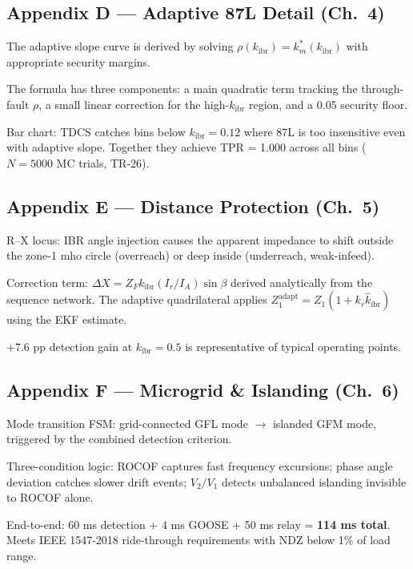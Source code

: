 \documentclass[12pt, a4paper]{article}
\newenvironment{notebox}{%
  \begin{tcolorbox}[
    colback=noteBg,
    colframe=iitmMaroon!40,
    boxrule=0.6pt,
    arc=3pt,
    left=8pt, right=8pt, top=6pt, bottom=6pt
  ]
  \setstretch{1.4}\small
}{%
  \end{tcolorbox}
}
\begin{document}
\subsection*{Appendix D --- Adaptive 87L Detail (Ch.\ 4)}
\begin{notebox}
The adaptive slope curve is derived by solving $\rho(k_\text{ibr}) = k_m^*(k_\text{ibr})$
with appropriate security margins.

The formula has three components: a main quadratic term tracking the through-fault
$\rho$, a small linear correction for the high-$k_\text{ibr}$ region, and a 0.05 security
floor.

Bar chart: TDCS catches bins below $k_\text{ibr} = 0.12$ where 87L is too insensitive
even with adaptive slope. Together they achieve TPR = 1.000 across all bins
($N = 5000$ MC trials, TR-26).
\end{notebox}

\subsection*{Appendix E --- Distance Protection (Ch.\ 5)}
\begin{notebox}
R--X locus: IBR angle injection causes the apparent impedance to shift outside the
zone-1 mho circle (overreach) or deep inside (underreach, weak-infeed).

Correction term: $\Delta X = Z_F k_\text{ibr} (I_r/I_A) \sin\beta$ derived analytically
from the sequence network. The adaptive quadrilateral applies
$Z_1^\text{adapt} = Z_1(1 + k_r \hat{k}_\text{ibr})$ using the EKF estimate.

$+7.6$ pp detection gain at $k_\text{ibr} = 0.5$ is representative of typical operating
points.
\end{notebox}

\subsection*{Appendix F --- Microgrid \& Islanding (Ch.\ 6)}
\begin{notebox}
Mode transition FSM: grid-connected GFL mode $\to$ islanded GFM mode, triggered by the
combined detection criterion.

Three-condition logic: ROCOF captures fast frequency excursions; phase angle deviation
catches slower drift events; $V_2/V_1$ detects unbalanced islanding invisible to ROCOF
alone.

End-to-end: 60 ms detection + 4 ms GOOSE + 50 ms relay = \textbf{114 ms total}.
Meets IEEE 1547-2018 ride-through requirements with NDZ below 1\% of load range.
\end{notebox}
\end{document}
